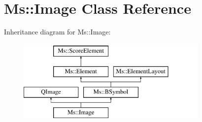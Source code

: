 \hypertarget{class_ms_1_1_image}{}\section{Ms\+:\+:Image Class Reference}
\label{class_ms_1_1_image}
Inheritance diagram for Ms\+:\+:Image\+:\begin{figure}[H]
\begin{center}
\leavevmode
\includegraphics[height=4.000000cm]{class_ms_1_1_image}
\end{center}
\end{figure}

